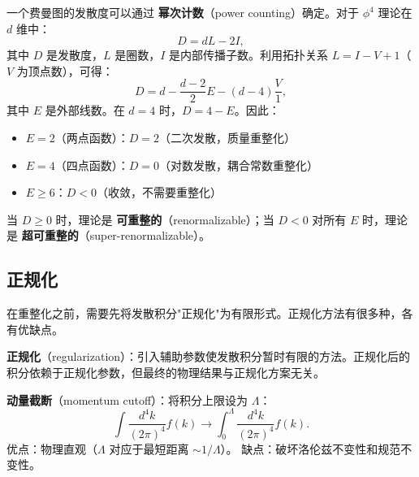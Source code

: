 \begin{remark}[幂次计数与发散度]
一个费曼图的发散度可以通过 \textbf{幂次计数}（power counting）确定。对于 $\phi^4$ 理论在 $d$ 维中：
\begin{equation}
    D = d L - 2I,
\end{equation}
其中 $D$ 是发散度，$L$ 是圈数，$I$ 是内部传播子数。利用拓扑关系 $L = I - V + 1$（$V$ 为顶点数），可得：
\begin{equation}
    D = d - \frac{d-2}{2}E - (d-4)\frac{V}{1},
\end{equation}
其中 $E$ 是外部线数。在 $d=4$ 时，$D = 4 - E$。因此：
\begin{itemize}
    \item $E = 2$（两点函数）：$D = 2$（二次发散，质量重整化）
    \item $E = 4$（四点函数）：$D = 0$（对数发散，耦合常数重整化）
    \item $E \geq 6$：$D < 0$（收敛，不需要重整化）
\end{itemize}
当 $D \geq 0$ 时，理论是 \textbf{可重整的}（renormalizable）；当 $D < 0$ 对所有 $E$ 时，理论是 \textbf{超可重整的}（super-renormalizable）。
\end{remark}


\subsection{正规化}

在重整化之前，需要先将发散积分"正规化"为有限形式。正规化方法有很多种，各有优缺点。

\begin{definition}[正规化]
\textbf{正规化}（regularization）：引入辅助参数使发散积分暂时有限的方法。正规化后的积分依赖于正规化参数，但最终的物理结果与正规化方案无关。
\end{definition}

\begin{example}[动量截断正规化]
\textbf{动量截断}（momentum cutoff）：将积分上限设为 $\Lambda$：
\begin{equation}
    \int \frac{d^4 k}{(2\pi)^4} f(k) \to \int_0^\Lambda \frac{d^4 k}{(2\pi)^4} f(k).
\end{equation}
优点：物理直观（$\Lambda$ 对应于最短距离 $\sim 1/\Lambda$）。
缺点：破坏洛伦兹不变性和规范不变性。
\end{example}

